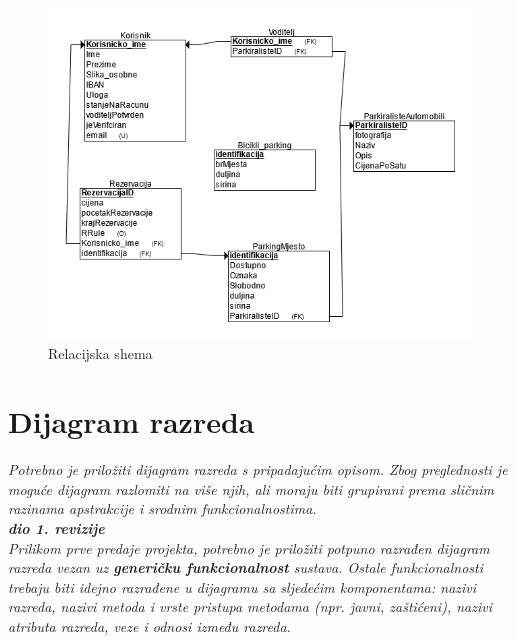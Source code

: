 				\begin{figure}[H]
					\includegraphics[scale=0.7]{slike/rlcdiagram.PNG} %
					\caption{Relacijska shema}
					\label{fig:relshema} %
				\end{figure}
				
				
				
				
				
			
			
			
			
			
			\eject
			
			
		\section{Dijagram razreda}
		
			\textit{Potrebno je priložiti dijagram razreda s pripadajućim opisom. Zbog preglednosti je moguće dijagram razlomiti na više njih, ali moraju biti grupirani prema sličnim razinama apstrakcije i srodnim funkcionalnostima.}\\
			
			\textbf{\textit{dio 1. revizije}}\\
			
			\textit{Prilikom prve predaje projekta, potrebno je priložiti potpuno razrađen dijagram razreda vezan uz \textbf{generičku funkcionalnost} sustava. Ostale funkcionalnosti trebaju biti idejno razrađene u dijagramu sa sljedećim komponentama: nazivi razreda, nazivi metoda i vrste pristupa metodama (npr. javni, zaštićeni), nazivi atributa razreda, veze i odnosi između razreda.}\\
			
